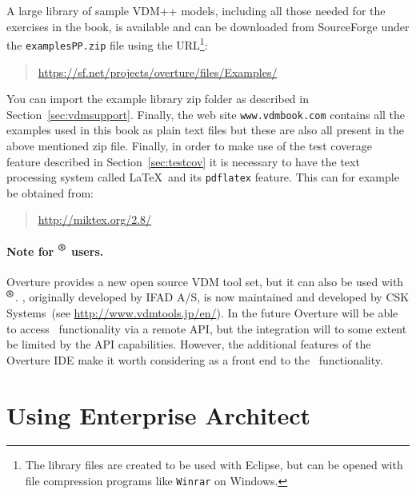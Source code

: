 A large library of sample VDM++ models, including all those needed
for the exercises in the book, is available and can be downloaded from
SourceForge under the \texttt{examplesPP.zip} file using the
URL\footnote{The library files are created to be used with Eclipse,
  but can be opened with file compression programs like \texttt{Winrar} on
  Windows.}:
\begin{quote}
\url{https://sf.net/projects/overture/files/Examples/}
\end{quote}
You can import the example library zip folder as described in
Section~\ref{sec:vdmsupport}.  Finally, the web site
\texttt{www.vdmbook.com} contains all the examples used in this book
as plain text files but these are also all present in the above
mentioned zip file. Finally, in order to make use of the
test coverage feature described in Section~\ref{sec:testcov} it is
necessary to have the text processing system called \LaTeX\ and its
\texttt{pdflatex} feature. This can for example be obtained from:
\begin{quote}
\url{http://miktex.org/2.8/}
\end{quote}


\paragraph{Note for \vdmtools$^{\mbox{\small\textbf{{\textregistered}}}}$ users.} 
Overture provides a new open source VDM tool set, but it can
also be used with
\vdmtools$^{\mbox{\small\textbf{{\textregistered}}}}$. \vdmtools, originally developed by IFAD A/S, is now
maintained and developed by CSK Systems~(see
\url{http://www.vdmtools.jp/en/}). In the future Overture will be able
to access
\vdmtools\ functionality via a remote API, but the integration will to
some extent be limited by the API capabilities. However, the additional
features of the Overture IDE make it worth considering as a front end
to the \vdmtools\ functionality.



 
\section{Using Enterprise Architect}\label{sec:Rose}

